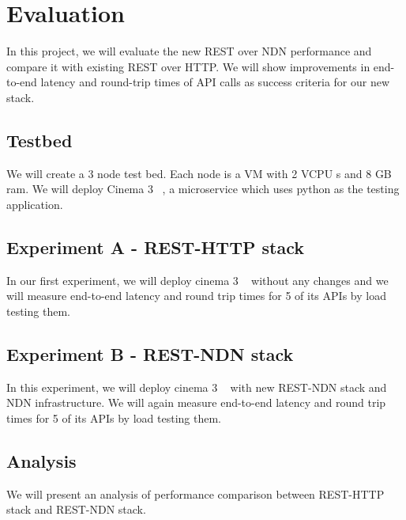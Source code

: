 \section{Evaluation}\label{evaluation}
In this project, we will evaluate the new REST over NDN performance and compare it with existing REST over HTTP. We will show improvements in end-to-end latency and round-trip times of API calls as success criteria for our new stack.  

\subsection{Testbed}
We will create a 3 node test bed. Each node is a VM with 2 VCPU s and 8 GB ram. We will deploy Cinema 3 ~\cite{Cinema}, a microservice which uses python as the testing application.

\subsection{Experiment A - REST-HTTP stack}
In our first experiment, we will deploy cinema 3 ~\cite{Cinema} without any changes and we will measure end-to-end latency and round trip times for 5 of its APIs by load testing them.

\subsection{Experiment B - REST-NDN stack}
In this experiment, we will deploy cinema 3 ~\cite{Cinema} with new REST-NDN stack and NDN infrastructure. We will again measure end-to-end latency and round trip times for 5 of its APIs by load testing them.

\subsection{Analysis}
We will present an analysis of performance comparison between REST-HTTP stack and REST-NDN stack.